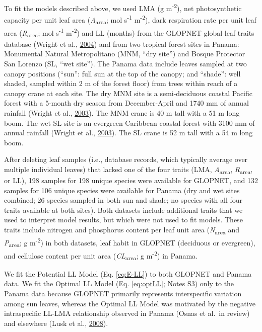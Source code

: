 \documentclass[12pt,]{article}
\theoremstyle{definition}
\theoremstyle{definition}
\theoremstyle{definition}
\theoremstyle{remark}
\begin{document}
To fit the models described above, we used LMA (g
m\textsuperscript{-2}), net photosynthetic capacity per unit leaf area
(\emph{A}\textsubscript{area}; mol s\textsuperscript{-1}
m\textsuperscript{-2}), dark respiration rate per unit leaf area
(\emph{R}\textsubscript{area}; mol s\textsuperscript{-1}
m\textsuperscript{-2}) and LL (months) from the GLOPNET global leaf
traits database (Wright et al.,
\protect\hyperlink{ref-Wright2004}{2004}) and from two tropical forest
sites in Panama: Monumental Natural Metropolitano (MNM, ``dry site'')
and Bosque Protector San Lorenzo (SL, ``wet site''). The Panama data
include leaves sampled at two canopy positions (``sun'': full sun at the
top of the canopy; and ``shade'': well shaded, sampled within 2 m of the
forest floor) from trees within reach of a canopy crane at each site.
The dry MNM site is a semi-deciduous coastal Pacific forest with a
5-month dry season from December-April and 1740 mm of annual rainfall
(Wright et al., \protect\hyperlink{ref-Wright2003}{2003}). The MNM crane
is 40 m tall with a 51 m long boom. The wet SL site is an evergreen
Caribbean coastal forest with 3100 mm of annual rainfall (Wright et al.,
\protect\hyperlink{ref-Wright2003}{2003}). The SL crane is 52 m tall
with a 54 m long boom.

After deleting leaf samples (i.e., database records, which typically
average over multiple individual leaves) that lacked one of the four
traits (LMA, \emph{A}\textsubscript{area}, \emph{R}\textsubscript{area},
or LL), 198 samples for 198 unique species were available for GLOPNET,
and 132 samples for 106 unique species were available for Panama (dry
and wet sites combined; 26 species sampled in both sun and shade; no
species with all four traits available at both sites). Both datasets
include additional traits that we used to interpret model results, but
which were not used to fit models. These traits include nitrogen and
phosphorus content per leaf unit area (\emph{N}\textsubscript{area} and
\emph{P}\textsubscript{area}; g m\textsuperscript{-2}) in both datasets,
leaf habit in GLOPNET (deciduous or evergreen), and cellulose content
per unit area (\emph{CL}\textsubscript{area}; g m\textsuperscript{-2})
in Panama.

We fit the Potential LL Model (Eq. \eqref{eq:E-LL}) to both GLOPNET and
Panama data. We fit the Optimal LL Model (Eq. \eqref{eq:optLL}; Notes S3)
only to the Panama data because GLOPNET primarily represents
interspecific variation among sun leaves, whereas the Optimal LL Model
was motivated by the negative intraspecific LL-LMA relationship observed
in Panama (Osnas et al.~in review) and elsewhere (Lusk et al.,
\protect\hyperlink{ref-Lusk2008}{2008}).
\end{document}
